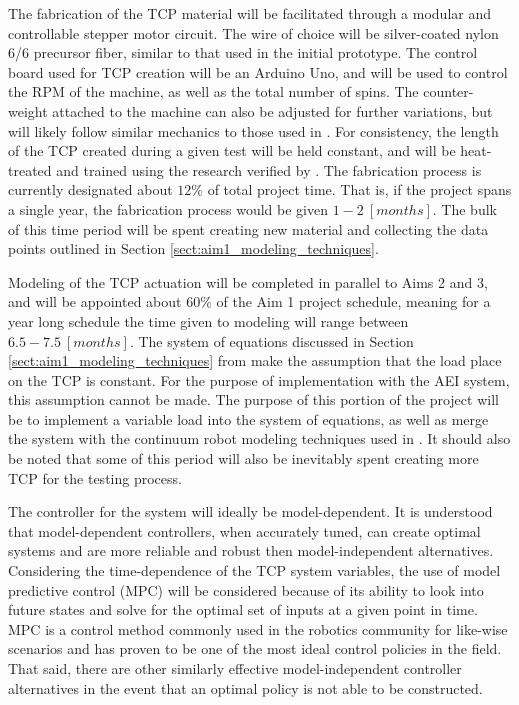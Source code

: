 		The fabrication of the TCP material will be facilitated through a modular and controllable stepper motor circuit. The wire of choice will be silver-coated nylon 6/6 precursor fiber, similar to that used in the initial prototype. The control board used for TCP creation will be an Arduino Uno, and will be used to control the RPM of the machine, as well as the total number of spins. The counter-weight attached to the machine can also be adjusted for further variations, but will likely follow similar mechanics to those used in \cite{wu_compact_2017, haines_new_2016, saharan_novel_2019}. For consistency, the length of the TCP created during a given test will be held constant, and will be heat-treated and trained using the research verified by \cite{wu_compact_2017, haines_new_2016}. The fabrication process is currently designated about $12\%$ of total project time. That is, if the project spans a single year, the fabrication process would be given $1-2\ [months]$. The bulk of this time period will be spent creating new material and collecting the data points outlined in Section \ref{sect:aim1_modeling_techniques}.
	
		Modeling of the TCP actuation will be completed in parallel to Aims 2 and 3, and will be appointed about $60\%$ of the Aim 1 project schedule, meaning for a year long schedule the time given to modeling will range between $6.5-7.5\ [months]$. The system of equations discussed in Section \ref{sect:aim1_modeling_techniques} from \cite{wu_compact_2017} make the assumption that the load place on the TCP is constant. For the purpose of implementation with the AEI system, this assumption cannot be made. The purpose of this portion of the project will be to implement a variable load into the system of equations, as well as merge the system with the continuum robot modeling techniques used in \cite{rao_how_2021}. It should also be noted that some of this period will also be inevitably spent creating more TCP for the testing process.

		The controller for the system will ideally be model-dependent. It is understood that model-dependent controllers, when accurately tuned, can create optimal systems and are more reliable and robust then model-independent alternatives. Considering the time-dependence of the TCP system variables, the use of model predictive control (MPC) will be considered because of its ability to look into future states and solve for the optimal set of inputs at a given point in time. MPC is a control method commonly used in the robotics community for like-wise scenarios and has proven to be one of the most ideal control policies in the field. That said, there are other similarly effective model-independent controller alternatives in the event that an optimal policy is not able to be constructed.

